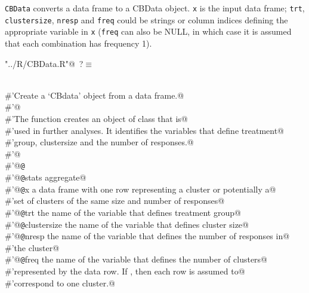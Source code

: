 \documentclass[reqno]{amsart}
\renewcommand{\NWtarget}[2]{\hypertarget{#1}{#2}}
\begin{document}
\texttt{CBData} converts a data frame to a CBData object. \texttt{x}
is the input data frame; \texttt{trt}, \texttt{clustersize}, \texttt{nresp} and
\texttt{freq} could be strings or column indices defining the appropriate
variable in \texttt{x} (\texttt{freq} can also be NULL, in which case it is 
assumed that each combination has frequency 1).
\begin{flushleft} \small\label{scrap2}\raggedright\small
\NWtarget{nuweb?}{} \verb@"../R/CBData.R"@\nobreak\ {\footnotesize {?}}$\equiv$
\vspace{-1ex}
\begin{list}{}{} \item
\mbox{}\verb@@\\
\mbox{}\verb@#'Create a `CBdata' object from a data frame.@\\
\mbox{}\verb@#'@\\
\mbox{}\verb@#'The  function creates an object of class  that is@\\
\mbox{}\verb@#'used in further analyses. It identifies the variables that define treatment@\\
\mbox{}\verb@#'group, clustersize and the number of responses.@\\
\mbox{}\verb@#'@\\
\mbox{}\verb@#'@{\tt @}\verb@export@\\
\mbox{}\verb@#'@{\tt @}\verb@importFrom stats aggregate@\\
\mbox{}\verb@#'@{\tt @}\verb@param x a data frame with one row representing a cluster or potentially a@\\
\mbox{}\verb@#'set of clusters of the same size and number of responses@\\
\mbox{}\verb@#'@{\tt @}\verb@param trt the name of the variable that defines treatment group@\\
\mbox{}\verb@#'@{\tt @}\verb@param clustersize the name of the variable that defines cluster size@\\
\mbox{}\verb@#'@{\tt @}\verb@param nresp the name of the variable that defines the number of responses in@\\
\mbox{}\verb@#'the cluster@\\
\mbox{}\verb@#'@{\tt @}\verb@param freq the name of the variable that defines the number of clusters@\\
\mbox{}\verb@#'represented by the data row. If , then each row is assumed to@\\
\mbox{}\verb@#'correspond to one cluster.@\\

\end{list}
\end{flushleft}
\end{document}
